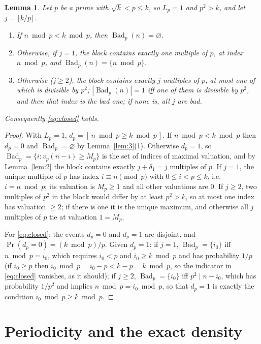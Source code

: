 \documentclass[11pt]{amsart}
\newtheorem{lemma}[theorem]{Lemma}
\theoremstyle{remark}
\DeclareMathOperator{\Bad}{Bad}
\renewcommand{\Pr}{\operatorname{Pr}}
\begin{document}
\begin{lemma}\label{lem:6}
Let $p$ be a prime with $\sqrt k<p\le k$, so $L_p=1$ and $p^2>k$, and let $j=\lfloor k/p\rfloor$.
\begin{enumerate}
\item If $n\bmod p<k\bmod p$, then $\Bad_p(n)=\varnothing$.
\item Otherwise, if $j=1$, the block contains exactly one multiple of $p$, at index $n\bmod p$, and $\Bad_p(n)=\{n\bmod p\}$.
\item Otherwise ($j\ge2$), the block contains exactly $j$ multiples of $p$, at most one of which is divisible by $p^2$; $|\Bad_p(n)|=1$ iff one of them is divisible by $p^2$, and then that index is the bad one; if none is, all $j$ are bad.
\end{enumerate}
Consequently \eqref{eq:closed} holds.
\end{lemma}
\begin{proof}
With $L_p=1$, $d_p=[\,n\bmod p\ge k\bmod p\,]$. If $n\bmod p<k\bmod p$ then $d_p=0$ and $\Bad_p=\varnothing$ by Lemma~\ref{lem:3}(1). Otherwise $d_p=1$, so $\Bad_p=\{i: v_p(n-i)\ge M_p\}$ is the set of indices of maximal valuation, and by Lemma~\ref{lem:2} the block contains exactly $j+\delta_1=j$ multiples of $p$. If $j=1$, the unique multiple of $p$ has index $i\equiv n\pmod p$ with $0\le i<p\le k$, i.e.\ $i=n\bmod p$; its valuation is $M_p\ge1$ and all other valuations are $0$. If $j\ge2$, two multiples of $p^2$ in the block would differ by at least $p^2>k$, so at most one index has valuation $\ge2$; if there is one it is the unique maximum, and otherwise all $j$ multiples of $p$ tie at valuation $1=M_p$.

For \eqref{eq:closed}: the events $d_p=0$ and $d_p=1$ are disjoint, and $\Pr(d_p=0)=(k\bmod p)/p$. Given $d_p=1$: if $j=1$, $\Bad_p=\{i_0\}$ iff $n\bmod p=i_0$, which requires $i_0<p$ and $i_0\ge k\bmod p$ and has probability $1/p$ (if $i_0\ge p$ then $i_0\bmod p=i_0-p<k-p=k\bmod p$, so the indicator in \eqref{eq:closed} vanishes, as it should); if $j\ge2$, $\Bad_p=\{i_0\}$ iff $p^2\mid n-i_0$, which has probability $1/p^2$ and implies $n\bmod p=i_0\bmod p$, so that $d_p=1$ is exactly the condition $i_0\bmod p\ge k\bmod p$.
\end{proof}

\section{Periodicity and the exact density}\label{sec:density}
\end{document}
